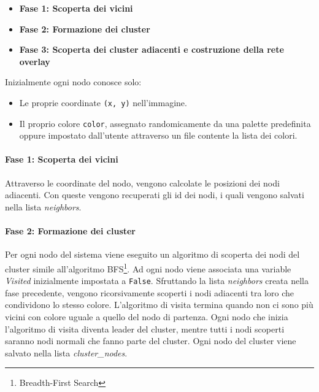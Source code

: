 \documentclass[12pt, a4paper]{report}
\begin{document}
\begin{itemize}
    \item \textbf{Fase 1: Scoperta dei vicini}
    \item \textbf{Fase 2: Formazione dei cluster}
    \item \textbf{Fase 3: Scoperta dei cluster adiacenti e costruzione della rete overlay}
\end{itemize}


Inizialmente ogni nodo conosce solo:
\begin{itemize}
    \item Le proprie coordinate \texttt{(x, y)} nell'immagine.
    \item Il proprio colore \texttt{color}, assegnato randomicamente da una palette predefinita oppure impostato dall'utente attraverso un file contente la lista dei colori.
\end{itemize}

\paragraph{Fase 1: Scoperta dei vicini}
Attraverso le coordinate del nodo, vengono calcolate le posizioni dei nodi adiacenti. Con queste vengono recuperati gli id dei nodi, i quali vengono salvati nella lista \textit{neighbors}.

\paragraph{Fase 2: Formazione dei cluster}
Per ogni nodo del sistema viene eseguito un algoritmo di scoperta dei nodi del cluster simile all'algoritmo BFS\footnote{Breadth-First Search}. Ad ogni nodo viene associata una variable \textit{Visited} inizialmente impostata a \texttt{False}. Sfruttando la lista \textit{neighbors} creata nella fase precedente, vengono ricorsivamente scoperti i nodi adiacenti tra loro che condividono lo stesso colore. L'algoritmo di visita termina quando non ci sono pi\`u vicini con colore uguale a quello del nodo di partenza. Ogni nodo che inizia l'algoritmo di visita diventa leader del cluster, mentre tutti i nodi scoperti saranno nodi normali che fanno parte del cluster. Ogni nodo del cluster viene salvato nella lista \textit{cluster\_nodes}.
    
\end{document}
